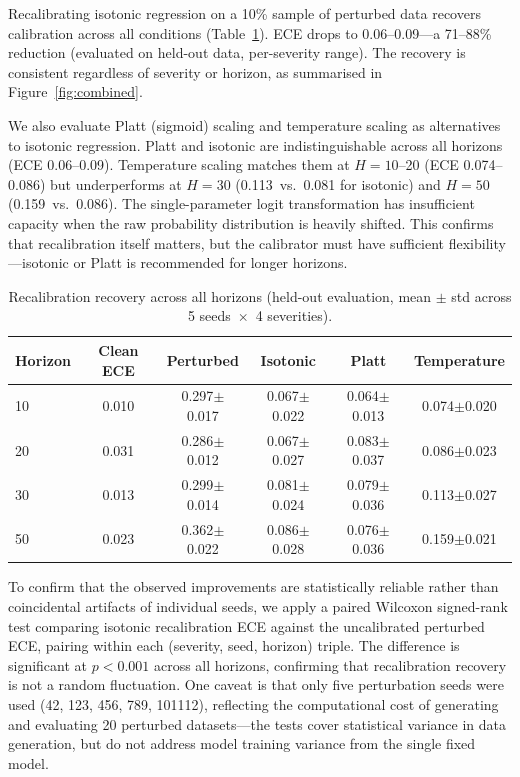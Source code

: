 \documentclass[11pt,a4paper]{article}
\begin{document}
Recalibrating isotonic regression on a 10\% sample of perturbed data recovers calibration across all conditions (Table~\ref{tab:recal_summary}). ECE drops to 0.06--0.09---a 71--88\% reduction (evaluated on held-out data, per-severity range). The recovery is consistent regardless of severity or horizon, as summarised in Figure~\ref{fig:combined}.

We also evaluate Platt (sigmoid) scaling and temperature scaling as alternatives to isotonic regression. Platt and isotonic are indistinguishable across all horizons (ECE 0.06--0.09). Temperature scaling matches them at \(H=10\)--20 (ECE 0.074--0.086) but underperforms at \(H=30\) (0.113~vs.\ 0.081 for isotonic) and \(H=50\) (0.159~vs.\ 0.086). The single-parameter logit transformation has insufficient capacity when the raw probability distribution is heavily shifted. This confirms that recalibration itself matters, but the calibrator must have sufficient flexibility---isotonic or Platt is recommended for longer horizons.

\begin{table}[htbp]
\centering
\caption{Recalibration recovery across all horizons (held-out evaluation, mean $\pm$ std across 5 seeds~$\times$~4 severities).}
\label{tab:recal_summary}
\begin{tabular}{@{}lccccc@{}}
\toprule
Horizon & Clean ECE & Perturbed & Isotonic & Platt & Temperature \\
\midrule
10 & 0.010 & 0.297$\pm$0.017 & 0.067$\pm$0.022 & 0.064$\pm$0.013 & 0.074$\pm$0.020 \\
20 & 0.031 & 0.286$\pm$0.012 & 0.067$\pm$0.027 & 0.083$\pm$0.037 & 0.086$\pm$0.023 \\
30 & 0.013 & 0.299$\pm$0.014 & 0.081$\pm$0.024 & 0.079$\pm$0.036 & 0.113$\pm$0.027 \\
50 & 0.023 & 0.362$\pm$0.022 & 0.086$\pm$0.028 & 0.076$\pm$0.036 & 0.159$\pm$0.021 \\
\bottomrule
\end{tabular}
\end{table}

To confirm that the observed improvements are statistically reliable rather than coincidental artifacts of individual seeds, we apply a paired Wilcoxon signed-rank test comparing isotonic recalibration ECE against the uncalibrated perturbed ECE, pairing within each (severity, seed, horizon) triple. The difference is significant at $p<0.001$ across all horizons, confirming that recalibration recovery is not a random fluctuation. One caveat is that only five perturbation seeds were used (42, 123, 456, 789, 101112), reflecting the computational cost of generating and evaluating 20 perturbed datasets---the tests cover statistical variance in data generation, but do not address model training variance from the single fixed model.
\end{document}
